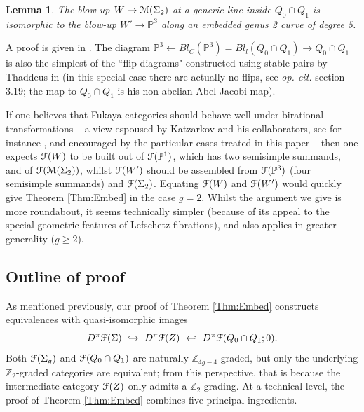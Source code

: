 \documentclass[reqno,10pt]{amsart}
\numberwithin{equation}{section}
\newcommand{\bP}{{\mathbb P}}
\newcommand{\bZ}{{\mathbb Z}}
\newcommand{\scrF}{\EuScript{F}}
\newcommand{\scrM}{\EuScript{M}}
\newtheorem{Lemma}[thm]{Lemma}
\theoremstyle{remark}
\begin{document}
\begin{Lemma}
The blow-up $W \rightarrow \scrM(\Sigma_2)$ at a generic line inside $Q_0\cap Q_1$ is isomorphic to the blow-up $W' \rightarrow \bP^3$ along an embedded genus 2 curve of degree 5.
\end{Lemma}

A proof is given in \cite{GH}.  The diagram $\bP^3 \leftarrow Bl_C(\bP^3) = Bl_l(Q_0\cap Q_1) \rightarrow Q_0\cap Q_1$ is also the simplest of the ``flip-diagrams" constructed using stable pairs by Thaddeus in \cite{Thaddeus} (in this special case there are actually no flips, see \emph{op. cit.} section 3.19; the map to $Q_0\cap Q_1$ is his non-abelian Abel-Jacobi map). 

If one believes that Fukaya categories should behave well under birational transformations -- a view espoused by Katzarkov and his collaborators, see for instance \cite{KKOY}, and encouraged by the particular cases treated in this paper -- then one expects $\scrF(W)$ to be built out of $\scrF(\bP^1)$, which has two semisimple summands,  and of $\scrF(\scrM(\Sigma_2))$, whilst $\scrF(W')$ should be assembled from $\scrF(\bP^3)$ (four semisimple summands) and $\scrF(\Sigma_2)$.  Equating $\scrF(W)$ and $\scrF(W')$ would quickly give Theorem \ref{Thm:Embed} in the case $g=2$. Whilst the argument we give is more roundabout, it seems technically simpler (because of its appeal to the special geometric features of Lefschetz fibrations), and also applies in greater generality ($g \geq 2$).

 
\subsection{Outline of proof}

As mentioned previously, 
our proof of Theorem \ref{Thm:Embed} constructs  equivalences with quasi-isomorphic images
\[
D^{\pi}\scrF(\Sigma) \ \hookrightarrow \ D^{\pi}\scrF(Z) \ \hookleftarrow  \ D^{\pi}\scrF(Q_0\cap Q_1;0).
\]
Both $\scrF(\Sigma_g)$ and $\scrF(Q_0 \cap Q_1)$ are naturally $\bZ_{4g-4}$-graded, but only the underlying $\bZ_2$-graded categories are equivalent; from this perspective, that is because the intermediate category $\scrF(Z)$ only admits a $\bZ_2$-grading.   At a technical level, the proof of Theorem \ref{Thm:Embed} combines five principal ingredients.
\end{document}
